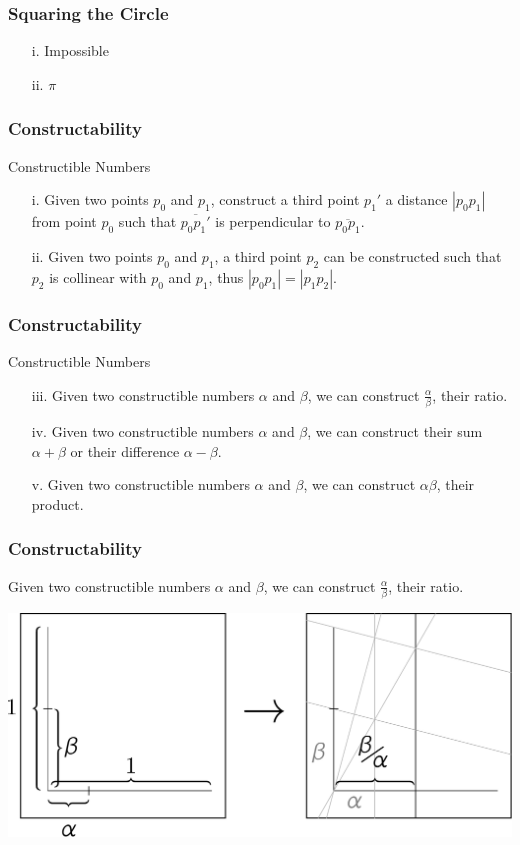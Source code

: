 \documentclass{beamer}
\begin{document}
\begin{frame}
\frametitle{Squaring the Circle}
\begin{enumerate}
\item[i.]
Impossible
\item[ii.]
$\pi$
\end{enumerate}
\end{frame}

\begin{frame}
\frametitle{Constructability}
\begin{block}{Constructible Numbers}
\begin{enumerate}
\item[i.]
Given two points $p_0$ and $p_1$, construct a third point $p_1'$ a distance $|p_0 p_1|$ from point $p_0$ such that $\overline{p_0 p_1'}$ is perpendicular to $\overline{p_0 p_1}$.
\item[ii.]
Given two points $p_0$ and $p_1$, a third point $p_2$ can be constructed such that $p_2$ is collinear with $p_0$ and $p_1$, thus $|p_0 p_1| = |p_1 p_2|$.
\end{enumerate}
\end{block}
\end{frame}

\begin{frame}
\frametitle{Constructability}
\begin{block}{Constructible Numbers}
\begin{enumerate}
\item[iii.]
Given two constructible numbers $\alpha$ and $\beta$, we can construct $\frac{\alpha}{\beta}$, their ratio.
\item[iv.]
Given two constructible numbers $\alpha$ and $\beta$, we can construct their sum $\alpha + \beta$ or their difference $\alpha - \beta$.
\item[v.]
Given two constructible numbers $\alpha$ and $\beta$, we can construct $\alpha\beta$, their product.
\end{enumerate}
\end{block}
\end{frame}

\begin{frame}
\frametitle{Constructability}
Given two constructible numbers $\alpha$ and $\beta$, we can construct $\frac{\alpha}{\beta}$, their ratio.

\begin{center}
\includegraphics[width=.8\textwidth]{constructions/division.pdf}
\end{center}
\end{frame}
\end{document}
